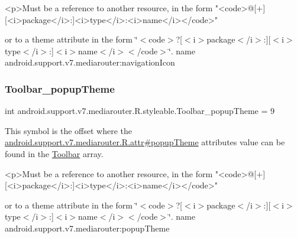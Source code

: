 \begin{DoxyVerb}      <p>Must be a reference to another resource, in the form "<code>@[+][<i>package</i>:]<i>type</i>:<i>name</i></code>"
\end{DoxyVerb}
 or to a theme attribute in the form \char`\"{}$<$code$>$?\mbox{[}$<$i$>$package$<$/i$>$\+:\mbox{]}\mbox{[}$<$i$>$type$<$/i$>$\+:\mbox{]}$<$i$>$name$<$/i$>$$<$/code$>$\char`\"{}.  name android.\+support.\+v7.\+mediarouter\+:navigation\+Icon \mbox{\label{classandroid_1_1support_1_1v7_1_1mediarouter_1_1R_1_1styleable_a48b8c2cdd2d740aa2c3750514fedfb2a}} 
\subsubsection{\texorpdfstring{Toolbar\+\_\+popup\+Theme}{Toolbar\_popupTheme}}
{\footnotesize\ttfamily int android.\+support.\+v7.\+mediarouter.\+R.\+styleable.\+Toolbar\+\_\+popup\+Theme = 9\hspace{0.3cm}{\ttfamily [static]}}

This symbol is the offset where the \hyperlink{classandroid_1_1support_1_1v7_1_1mediarouter_1_1R_1_1attr_af485292b7952a70814e465517913886a}{android.\+support.\+v7.\+mediarouter.\+R.\+attr\#popup\+Theme} attribute\textquotesingle{}s value can be found in the \hyperlink{classandroid_1_1support_1_1v7_1_1mediarouter_1_1R_1_1styleable_a6815cdfaadde30c82b955863af196899}{Toolbar} array.

\begin{DoxyVerb}      <p>Must be a reference to another resource, in the form "<code>@[+][<i>package</i>:]<i>type</i>:<i>name</i></code>"
\end{DoxyVerb}
 or to a theme attribute in the form \char`\"{}$<$code$>$?\mbox{[}$<$i$>$package$<$/i$>$\+:\mbox{]}\mbox{[}$<$i$>$type$<$/i$>$\+:\mbox{]}$<$i$>$name$<$/i$>$$<$/code$>$\char`\"{}.  name android.\+support.\+v7.\+mediarouter\+:popup\+Theme \mbox{\label{classandroid_1_1support_1_1v7_1_1mediarouter_1_1R_1_1styleable_a2d7c64e1a6cb4a3235e4193b4b60aab0}} 
